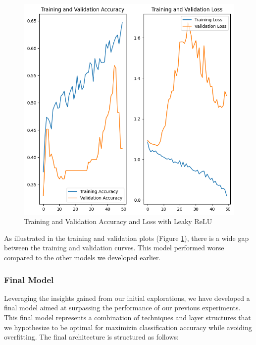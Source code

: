 \begin{figure}[H]
  \includegraphics[width=\linewidth]{figures/leaky_relu.png}
  \caption{Training and Validation Accuracy and Loss with Leaky ReLU}
  \label{fig:leaky_relu}
\end{figure}

As illustrated in the training and validation plots (Figure \ref{fig:leaky_relu}), there is a wide gap between the training and validation curves. This model performed worse compared to the other models we developed earlier.

\subsubsection{Final Model}

Leveraging the insights gained from our initial explorations, we have developed a final model aimed at surpassing the performance of our previous experiments. This final model represents a combination  of techniques and layer structures that we hypothesize to be optimal for maximizin classification accuracy while avoiding overfitting. The final architecture is structured as follows:

